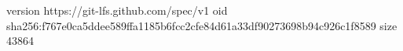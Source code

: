 version https://git-lfs.github.com/spec/v1
oid sha256:f767e0ca5ddee589ffa1185b6fcc2cfe84d61a33df90273698b94c926c1f8589
size 43864
